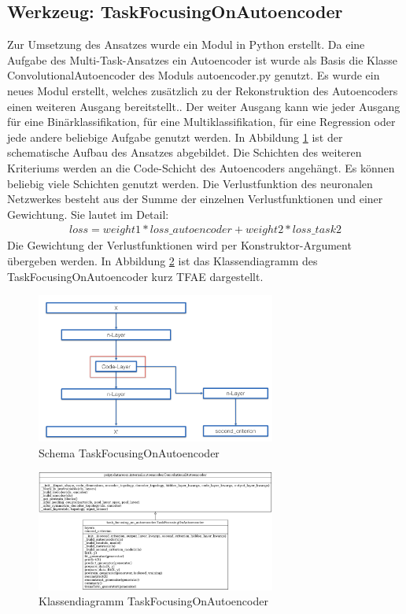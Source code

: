 	\subsection{Werkzeug: TaskFocusingOnAutoencoder}
	\label{subsec:SecondCriterionAutoenocder}
	Zur Umsetzung des Ansatzes wurde ein Modul in Python erstellt. Da eine Aufgabe des Multi-Task-Ansatzes ein Autoencoder ist wurde als Basis die Klasse ConvolutionalAutoencoder des Moduls autoencoder.py genutzt. Es wurde ein neues Modul erstellt, welches zusätzlich zu der Rekonstruktion des Autoencoders einen weiteren Ausgang bereitstellt.. Der weiter Ausgang kann wie jeder Ausgang für eine Binärklassifikation, für eine Multiklassifikation, für eine Regression oder jede andere beliebige Aufgabe genutzt werden. In Abbildung \ref{img:SchemaTFAE} ist der schematische Aufbau des Ansatzes abgebildet. Die Schichten des weiteren Kriteriums werden an die Code-Schicht des Autoencoders angehängt. Es können beliebig viele Schichten genutzt werden. Die Verlustfunktion des neuronalen Netzwerkes besteht aus der Summe der einzelnen Verlustfunktionen und einer Gewichtung. Sie lautet im Detail: 
	\begin{align}
	loss = weight1 * loss\_autoencoder + weight2 * loss\_task2
	\end{align}
	Die Gewichtung der Verlustfunktionen wird per Konstruktor-Argument übergeben werden. In Abbildung \ref{img:KlassendiagrammTFAE} ist das Klassendiagramm des TaskFocusingOnAutoencoder kurz TFAE dargestellt.
	\begin{figure}[h]
		\centering
		\includegraphics[width=0.7\textwidth, center]{bilder/Schema_Autoencoders/Schema_SCAE.png}
		\caption[Schema TaskFocusingOnAutoencoder]{Schema TaskFocusingOnAutoencoder}
		\label{img:SchemaTFAE}
	\end{figure}  
	\begin{figure}[h]
		\centering
		\includegraphics[width=0.7\textwidth, center]{bilder/Klassendiagramme/TFAE.png}
		\caption[Klassendiagramm TaskFocusingOnAutoencoder]{Klassendiagramm TaskFocusingOnAutoencoder}
		\label{img:KlassendiagrammTFAE}
	\end{figure}  
